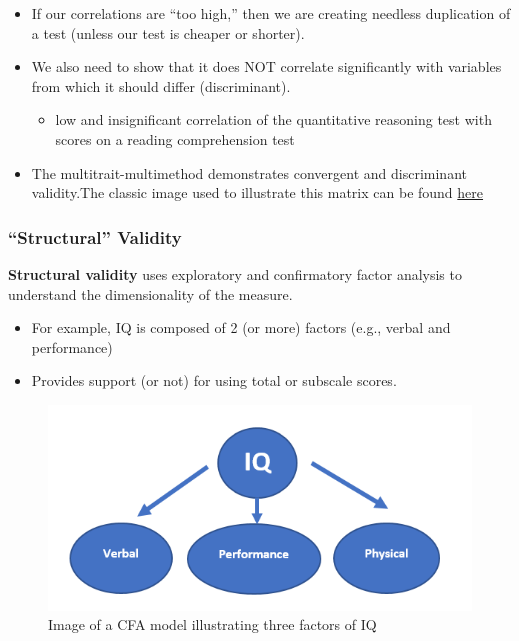 \documentclass[
  english,
]{book}
\providecommand{\tightlist}{%
  \setlength{\itemsep}{0pt}\setlength{\parskip}{0pt}}
\begin{document}
\begin{itemize}
\tightlist
\item
  If our correlations are ``too high,'' then we are creating needless duplication of a test (unless our test is cheaper or shorter).
\item
  We also need to show that it does NOT correlate significantly with variables from which it should differ (discriminant).

  \begin{itemize}
  \tightlist
  \item
    low and insignificant correlation of the quantitative reasoning test with scores on a reading comprehension test
  \end{itemize}
\item
  The multitrait-multimethod demonstrates convergent and discriminant validity.The classic image used to illustrate this matrix can be found \href{https://conjointly.com/kb/multitrait-multimethod-matrix/}{here}
  \citep{trochim_multitrait-multimethod_nodate}
\end{itemize}

\hypertarget{structural-validity}{%
\subsubsection{``Structural'' Validity}\label{structural-validity}}

\textbf{Structural validity} uses exploratory and confirmatory factor analysis to understand the dimensionality of the measure.

\begin{itemize}
\tightlist
\item
  For example, IQ is composed of 2 (or more) factors (e.g., verbal and performance)
\item
  Provides support (or not) for using total or subscale scores.
\end{itemize}

\begin{figure}
\centering
\includegraphics{images/PsychoM/CFA.png}
\caption{Image of a CFA model illustrating three factors of IQ}
\end{figure}
\end{document}

